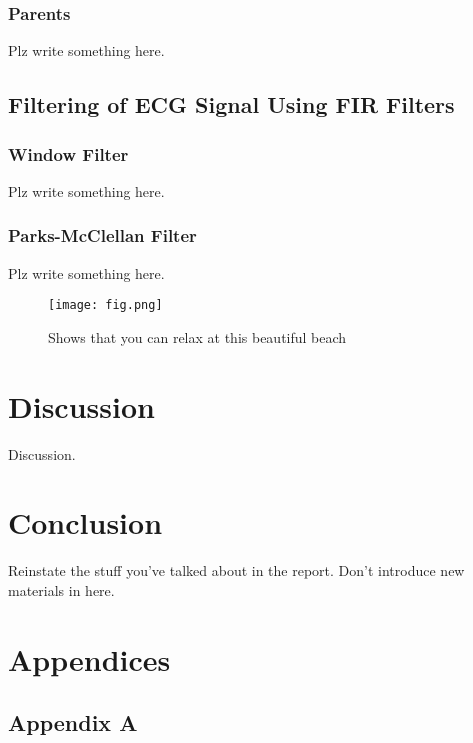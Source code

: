 \documentclass[a4paper, 11pt]{article}
\begin{document}
        \subsubsection{Parents}
            Plz write something here.
    \subsection{Filtering of ECG Signal Using FIR Filters}\label{sec:meth_sub5}
        \subsubsection{Window Filter}
            Plz write something here.
        \subsubsection{Parks-McClellan Filter}
            Plz write something here.
    
    \begin{figure}[h]
        \centering
        \graphicspath{{./wiki/}}
        \texttt{[image: fig.png]}
        \caption{Shows that you can relax at this beautiful beach}
        \label{Fig:my_label}
    \end{figure}

\section{Discussion}\label{sec:dis}
    Discussion.

\section{Conclusion}\label{sec:conc}
    Reinstate the stuff you've talked about in the report. Don't introduce new materials in here.

\pagebreak

\renewcommand{\bibname}{References}
\renewcommand{\bibsection}{\section{\bibname}}
\renewcommand{\cite}{\citep}

\pagebreak

\section{Appendices}
    \subsection{Appendix A}
\end{document}
